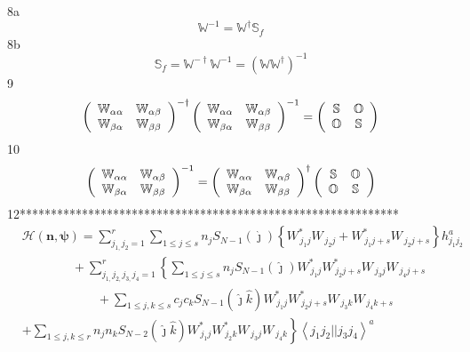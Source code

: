 \documentclass[aps,preprint]{revtex4}%
\begin{document}
8a%
\[
\mathbb{W}^{-1}=\mathbb{W}^{\dagger}\mathbb{S}_{f}%
\]
8b%
\[
\mathbb{S}_{f}=\mathbb{W}^{-\dagger}\mathbb{W}^{-1}=\left(  \mathbb{WW}%
^{\dagger}\right)  ^{-1}%
\]
9%
\[
\left(
\begin{array}
[c]{cc}%
\mathbb{W}_{\alpha\alpha} & \mathbb{W}_{\alpha\beta}\\
\mathbb{W}_{\beta\alpha} & \mathbb{W}_{\beta\beta}%
\end{array}
\right)  ^{-\dagger}\left(
\begin{array}
[c]{cc}%
\mathbb{W}_{\alpha\alpha} & \mathbb{W}_{\alpha\beta}\\
\mathbb{W}_{\beta\alpha} & \mathbb{W}_{\beta\beta}%
\end{array}
\right)  ^{-1}=\left(
\begin{array}
[c]{cc}%
\mathbb{S} & \mathbb{O}\\
\mathbb{O} & \mathbb{S}%
\end{array}
\right)
\]
10%
\[
\left(
\begin{array}
[c]{cc}%
\mathbb{W}_{\alpha\alpha} & \mathbb{W}_{\alpha\beta}\\
\mathbb{W}_{\beta\alpha} & \mathbb{W}_{\beta\beta}%
\end{array}
\right)  ^{-1}=\left(
\begin{array}
[c]{cc}%
\mathbb{W}_{\alpha\alpha} & \mathbb{W}_{\alpha\beta}\\
\mathbb{W}_{\beta\alpha} & \mathbb{W}_{\beta\beta}%
\end{array}
\right)  ^{\dagger}\left(
\begin{array}
[c]{cc}%
\mathbb{S} & \mathbb{O}\\
\mathbb{O} & \mathbb{S}%
\end{array}
\right)
\]
12*************************************************************%
\begin{align*}
&  \mathcal{H}\left(  \mathbf{n,\psi}\right)  =\sum_{j_{1,}j_{2}=1}^{r}%
\sum_{1\leq j\leq s}n_{j}S_{N-1}\left(  \hat{\jmath}\right)  \left\{
W_{\,j_{1}j}^{\ast}W_{\,j_{2}j}+W_{\,j_{1}j+s}^{\ast}W_{\,j_{2}j+s}\right\}
h_{j_{1}j_{2}}^{a}\\
&  \qquad\qquad+\sum_{j_{1,}j_{2,}j_{3,}j_{4}=1}^{r}\left\{  \overset
{}{\underset{}{}}\sum_{1\leq j\leq s}n_{j}S_{N-1}\left(  \hat{\jmath}\right)
W_{\,j_{1}j}^{\ast}W_{\,j_{2}j+s}^{\ast}W_{\,j_{3}j}W_{\,j_{4}j+s}\right.  \\
&  \qquad\qquad\qquad+\sum_{1\leq j,k\leq s}c_{j}c_{k}S_{N-1}\left(
\hat{\jmath}\hat{k}\right)  W_{\,j_{1}j}^{\ast}W_{\,j_{2}j+s}^{\ast}%
W_{\,j_{3}k}W_{\,j_{4}k+s}\\
&  \left.  {}\right.  \left.  +\sum_{1\leq j,k\leq r}n_{j}n_{k}S_{N-2}\left(
\hat{\jmath}\hat{k}\right)  W_{\,j_{1}j}^{\ast}W_{\,j_{2}k}^{\ast}W_{\,j_{3}%
j}W_{\,j_{4}k}\right\}  \left\langle j_{1}j_{2}||j_{3}j_{4}\right\rangle ^{a}%
\end{align*}
\end{document}

